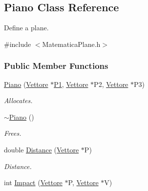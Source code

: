 \hypertarget{classPiano}{}\subsection{Piano Class Reference}
\label{classPiano}


Define a plane.  




{\ttfamily \#include $<$Matematica\+Plane.\+h$>$}

\subsubsection*{Public Member Functions}
\begin{DoxyCompactItemize}
\item 
\hyperlink{classPiano_a3e0f72f2e5410fb6ac0994b962e3b0f4}{Piano} (\hyperlink{classVettore}{Vettore} $\ast$\hyperlink{classPiano_aca046e5963a53f1b4a12c2ad4617149b}{P1}, \hyperlink{classVettore}{Vettore} $\ast$P2, \hyperlink{classVettore}{Vettore} $\ast$P3)\hypertarget{classPiano_a3e0f72f2e5410fb6ac0994b962e3b0f4}{}\label{classPiano_a3e0f72f2e5410fb6ac0994b962e3b0f4}

\begin{DoxyCompactList}\small\item\em Allocates. \end{DoxyCompactList}\item 
\hyperlink{classPiano_ae2f8ebc5dd8ecab651c1e8a0551ec11d}{$\sim$\+Piano} ()\hypertarget{classPiano_ae2f8ebc5dd8ecab651c1e8a0551ec11d}{}\label{classPiano_ae2f8ebc5dd8ecab651c1e8a0551ec11d}

\begin{DoxyCompactList}\small\item\em Frees. \end{DoxyCompactList}\item 
double \hyperlink{classPiano_a8ec22e845b3d00f3a815a132132fc9a1}{Distance} (\hyperlink{classVettore}{Vettore} $\ast$P)\hypertarget{classPiano_a8ec22e845b3d00f3a815a132132fc9a1}{}\label{classPiano_a8ec22e845b3d00f3a815a132132fc9a1}

\begin{DoxyCompactList}\small\item\em Distance. \end{DoxyCompactList}\item 
int \hyperlink{classPiano_a119e25248ace7e082367a7b64e3bcbc1}{Impact} (\hyperlink{classVettore}{Vettore} $\ast$P, \hyperlink{classVettore}{Vettore} $\ast$V)\hypertarget{classPiano_a119e25248ace7e082367a7b64e3bcbc1}{}\label{classPiano_a119e25248ace7e082367a7b64e3bcbc1}


\end{DoxyCompactItemize}
